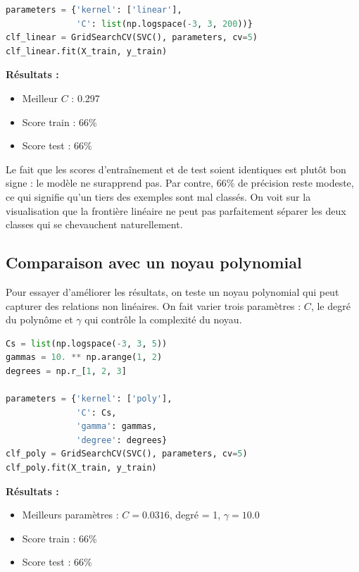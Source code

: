 \documentclass[11pt,a4paper]{article}
\begin{document}
\begin{lstlisting}[language=Python, caption=Optimisation du paramètre C avec noyau linéaire]
parameters = {'kernel': ['linear'], 
              'C': list(np.logspace(-3, 3, 200))}
clf_linear = GridSearchCV(SVC(), parameters, cv=5)
clf_linear.fit(X_train, y_train)
\end{lstlisting}

\textbf{Résultats :}
\begin{itemize}
    \item Meilleur $C$ : 0.297
    \item Score train : 66\%
    \item Score test : 66\%
\end{itemize}

Le fait que les scores d'entraînement et de test soient identiques est plutôt bon signe : le modèle ne surapprend pas. Par contre, 66\% de précision reste modeste, ce qui signifie qu'un tiers des exemples sont mal classés. On voit sur la visualisation que la frontière linéaire ne peut pas parfaitement séparer les deux classes qui se chevauchent naturellement.

\subsection{Comparaison avec un noyau polynomial}

Pour essayer d'améliorer les résultats, on teste un noyau polynomial qui peut capturer des relations non linéaires. On fait varier trois paramètres : $C$, le degré du polynôme et $\gamma$ qui contrôle la complexité du noyau.

\begin{lstlisting}[language=Python, caption=Optimisation avec noyau polynomial]
Cs = list(np.logspace(-3, 3, 5))
gammas = 10. ** np.arange(1, 2)
degrees = np.r_[1, 2, 3]

parameters = {'kernel': ['poly'], 
              'C': Cs, 
              'gamma': gammas, 
              'degree': degrees}
clf_poly = GridSearchCV(SVC(), parameters, cv=5)
clf_poly.fit(X_train, y_train)
\end{lstlisting}

\textbf{Résultats :}
\begin{itemize}
    \item Meilleurs paramètres : $C = 0.0316$, degré = 1, $\gamma = 10.0$
    \item Score train : 66\%
    \item Score test : 66\%
\end{itemize}
\end{document}
